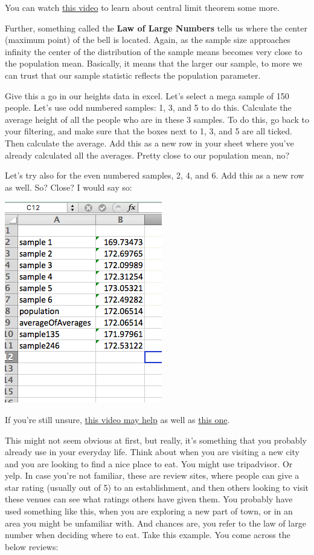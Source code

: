 \documentclass[
]{book}
\begin{document}
You can watch \href{https://www.youtube.com/watch?v=JNm3M9cqWyc}{this video} to learn about central limit theorem some more.

Further, something called the \textbf{Law of Large Numbers} tells us where the center (maximum point) of the bell is located. Again, as the sample size approaches infinity the center of the distribution of the sample means becomes very close to the population mean. Basically, it means that the larger our sample, to more we can trust that our sample statistic reflects the population parameter.

Give this a go in our heights data in excel. Let's select a mega sample of 150 people. Let's use odd numbered samples: 1, 3, and 5 to do this. Calculate the average height of all the people who are in these 3 samples. To do this, go back to your filtering, and make sure that the boxes next to 1, 3, and 5 are all ticked. Then calculate the average. Add this as a new row in your sheet where you've already calculated all the averages. Pretty close to our population mean, no?

Let's try also for the even numbered samples, 2, 4, and 6. Add this as a new row as well. So? Close? I would say so:

\includegraphics{imgs/larger_samples.png}

If you're still unsure, \href{https://www.youtube.com/watch?v=agBcvkyi6sg}{this video may help} as well as \href{https://www.youtube.com/watch?v=iN-77YVqLDw}{this one}.

This might not seem obvious at first, but really, it's something that you probably already use in your everyday life. Think about when you are visiting a new city and you are looking to find a nice place to eat. You might use tripadvisor. Or yelp. In case you're not familiar, these are review sites, where people can give a star rating (usually out of 5) to an establishment, and then others looking to visit these venues can see what ratings others have given them. You probably have used something like this, when you are exploring a new part of town, or in an area you might be unfamiliar with. And chances are, you refer to the law of large number when deciding where to eat. Take this example. You come across the below reviews:
\end{document}
